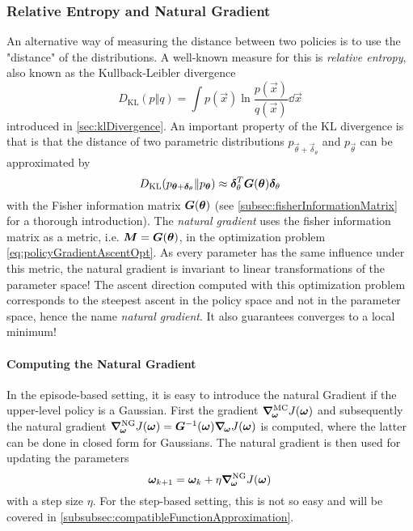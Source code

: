 			\subsubsection{Relative Entropy and Natural Gradient}
				An alternative way of measuring the distance between two policies is to use the "distance" of the distributions. A well-known measure for this is \emph{relative entropy}, also known as the Kullback-Leibler divergence
				\begin{equation*}
					D_\mathrm{KL}(p \Vert q) = \int\! p(\vec{x}) \ln \frac{p(\vec{x})}{q(\vec{x})} \dd{\vec{x}}
				\end{equation*}
				introduced in \autoref{sec:klDivergence}. An important property of the KL divergence is that is that the distance of two parametric distributions \( p_{\vec{\theta} + \vec{\delta}_\theta} \) and \( p_{\vec{\theta}} \) can be approximated by
				\begin{equation*}
					D_\mathrm{KL}(p_{\bm{\theta} + \bm{\delta}_\theta} \Vert p_{\bm{\theta}}) \approx \bm{\delta}_\theta^T \bm{G}(\bm{\theta}) \bm{\delta}_\theta
				\end{equation*}
				with the Fisher information matrix \( \bm{G}(\bm{\theta}) \) (see \autoref{subsec:fisherInformationMatrix} for a thorough introduction). The \emph{natural gradient} uses the fisher information matrix as a metric, i.e. \( \bm{M} = \bm{G}(\bm{\theta}) \), in the optimization problem \eqref{eq:policyGradientAscentOpt}. As every parameter has the same influence under this metric, the natural gradient is invariant to linear transformations of the parameter space! The ascent direction computed with this optimization problem corresponds to the steepest ascent in the policy space and not in the parameter space, hence the name \emph{natural gradient}. It also guarantees converges to a local minimum!

				\paragraph{Computing the Natural Gradient}
					In the episode-based setting, it is easy to introduce the natural Gradient if the upper-level policy is a Gaussian. First the gradient \( \grad_{\!\bm{\omega}}^\mathrm{MC} J(\bm{\omega}) \) and subsequently the natural gradient \( \grad_{\!\bm{\omega}}^\mathrm{NG} J(\bm{\omega}) = \bm{G}^{-1}(\bm{\omega}) \grad_{\!\bm{\omega}} J(\bm{\omega}) \) is computed, where the latter can be done in closed form for Gaussians. The natural gradient is then used for updating the parameters
					\begin{equation*}
						\bm{\omega}_{k + 1} = \bm{\omega}_k + \eta \grad_{\!\bm{\omega}}^\mathrm{NG} J(\bm{\omega})
					\end{equation*}
					with a step size \(\eta\). For the step-based setting, this is not so easy and will be covered in \autoref{subsubsec:compatibleFunctionApproximation}.

